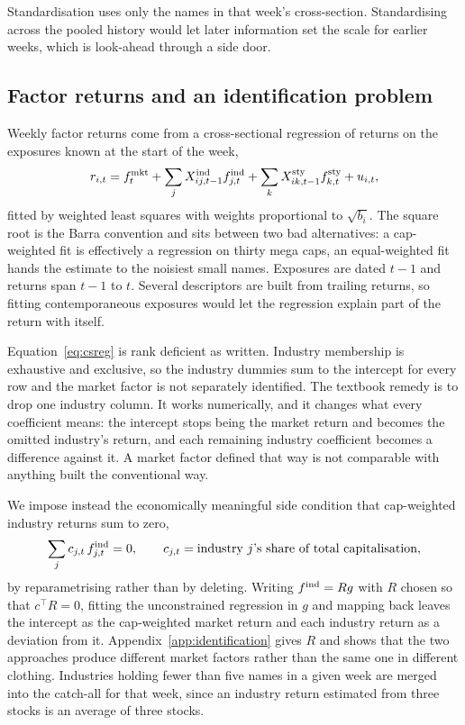 Standardisation uses only the names in that week's cross-section. Standardising
across the pooled history would let later information set the scale for earlier
weeks, which is look-ahead through a side door.

\subsection{Factor returns and an identification problem}
Weekly factor returns come from a cross-sectional regression of returns on the
exposures known at the start of the week,
\begin{equation}
 r_{i,t} = f^{\rm mkt}_t
         + \sum_j X^{\mathrm{ind}}_{ij,t-1} f^{\rm ind}_{j,t}
         + \sum_k X^{\mathrm{sty}}_{ik,t-1} f^{\rm sty}_{k,t}
         + u_{i,t},
 \label{eq:csreg}
\end{equation}
fitted by weighted least squares with weights proportional to $\sqrt{b_i}$. The
square root is the Barra convention and sits between two bad alternatives: a
cap-weighted fit is effectively a regression on thirty mega caps, an
equal-weighted fit hands the estimate to the noisiest small names. Exposures
are dated $t-1$ and returns span $t-1$ to $t$. Several descriptors are built
from trailing returns, so fitting contemporaneous exposures would let the
regression explain part of the return with itself.

Equation~\eqref{eq:csreg} is rank deficient as written. Industry membership is
exhaustive and exclusive, so the industry dummies sum to the intercept for
every row and the market factor is not separately identified. The textbook
remedy is to drop one industry column. It works numerically, and it changes
what every coefficient means: the intercept stops being the market return and
becomes the omitted industry's return, and each remaining industry coefficient
becomes a difference against it. A market factor defined that way
is not comparable with anything built the conventional way.

We impose instead the economically meaningful side condition that cap-weighted
industry returns sum to zero,
\begin{equation}
 \sum_j c_{j,t}\, f^{\rm ind}_{j,t} = 0,
 \qquad c_{j,t} = \text{industry } j\text{'s share of total capitalisation},
 \label{eq:zerosum}
\end{equation}
by reparametrising rather than by deleting. Writing $f^{\rm ind} = Rg$ with $R$
chosen so that $c^{\top}R = 0$, fitting the unconstrained regression in $g$ and
mapping back leaves the intercept as the cap-weighted market return and each
industry return as a deviation from it. Appendix~\ref{app:identification} gives
$R$ and shows that the two approaches produce different market factors rather
than the same one in different clothing. Industries holding fewer than five
names in a given week are merged into the catch-all for that week, since an
industry return estimated from three stocks is an average of three stocks.


